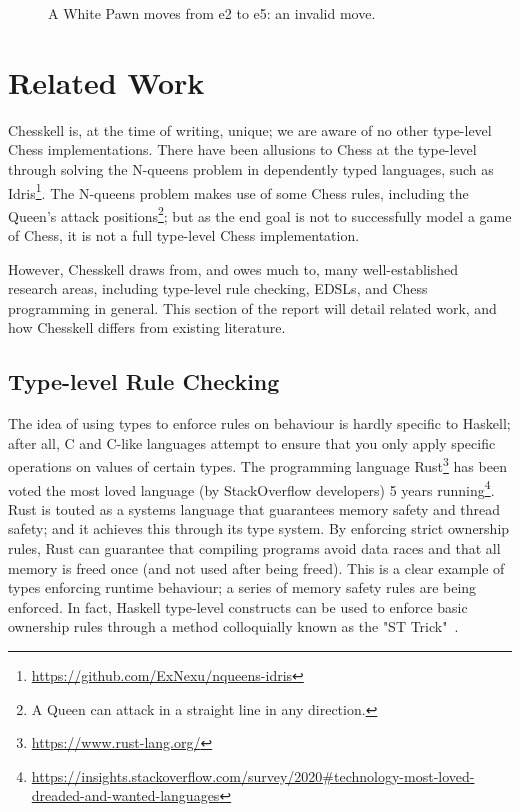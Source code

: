 \begin{figure}[h]
    \centering
    \vspace*{1cm}
    \showboard
    \quad
    \showboard
    \caption{A White Pawn moves from e2 to e5: an invalid move.}
    \label{badpawnmove}
\end{figure}

\section{Related Work}

Chesskell is, at the time of writing, unique; we are aware of no other type-level Chess implementations. There have been allusions to Chess at the type-level through solving the N-queens problem in dependently typed languages, such as Idris\footnote{\url{https://github.com/ExNexu/nqueens-idris}}. The N-queens problem makes use of some Chess rules, including the Queen's attack positions\footnote{A Queen can attack in a straight line in any direction.}; but as the end goal is not to successfully model a game of Chess, it is not a full type-level Chess implementation.

However, Chesskell draws from, and owes much to, many well-established research areas, including type-level rule checking, EDSLs, and Chess programming in general. This section of the report will detail related work, and how Chesskell differs from existing literature.

\subsection{Type-level Rule Checking}

The idea of using types to enforce rules on behaviour is hardly specific to Haskell; after all, C and C-like languages attempt to ensure that you only apply specific operations on values of certain types. The programming language Rust\footnote{\url{https://www.rust-lang.org/}} has been voted the most loved language (by StackOverflow developers) 5 years running\footnote{\url{https://insights.stackoverflow.com/survey/2020\#technology-most-loved-dreaded-and-wanted-languages}}. Rust is touted as a systems language that guarantees memory safety and thread safety; and it achieves this through its type system. By enforcing strict ownership rules, Rust can guarantee that compiling programs avoid data races and that all memory is freed once (and not used after being freed). This is a clear example of types enforcing runtime behaviour; a series of memory safety rules are being enforced. In fact, Haskell type-level constructs can be used to enforce basic ownership rules through a method colloquially known as the "ST Trick"~\cite{twt}.

